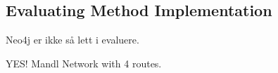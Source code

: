\subsection{Evaluating Method Implementation}

Neo4j er ikke så lett i evaluere.

YES! Mandl Network with 4 routes.



